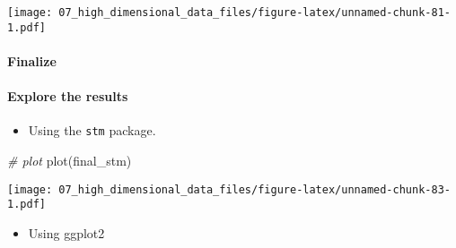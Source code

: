 \documentclass[
]{book}
\newenvironment{Shaded}{\begin{snugshade}}{\end{snugshade}}
\newcommand{\AttributeTok}[1]{\textcolor[rgb]{0.77,0.63,0.00}{#1}}
\newcommand{\CommentTok}[1]{\textcolor[rgb]{0.56,0.35,0.01}{\textit{#1}}}
\newcommand{\ConstantTok}[1]{\textcolor[rgb]{0.00,0.00,0.00}{#1}}
\newcommand{\DecValTok}[1]{\textcolor[rgb]{0.00,0.00,0.81}{#1}}
\newcommand{\FunctionTok}[1]{\textcolor[rgb]{0.00,0.00,0.00}{#1}}
\newcommand{\NormalTok}[1]{#1}
\newcommand{\OtherTok}[1]{\textcolor[rgb]{0.56,0.35,0.01}{#1}}
\newcommand{\SpecialCharTok}[1]{\textcolor[rgb]{0.00,0.00,0.00}{#1}}
\newcommand{\StringTok}[1]{\textcolor[rgb]{0.31,0.60,0.02}{#1}}
\providecommand{\tightlist}{%
  \setlength{\itemsep}{0pt}\setlength{\parskip}{0pt}}
\begin{document}
\texttt{[image: 07\_high\_dimensional\_data\_files/figure-latex/unnamed-chunk-81-1.pdf]}

\hypertarget{finalize}{%
\paragraph{Finalize}\label{finalize}}

\begin{Shaded}
\end{Shaded}

\hypertarget{explore-the-results}{%
\paragraph{Explore the results}\label{explore-the-results}}

\begin{itemize}
\tightlist
\item
  Using the \texttt{stm} package.
\end{itemize}

\begin{Shaded}
\begin{Highlighting}[]
\CommentTok{\# plot}
\FunctionTok{plot}\NormalTok{(final\_stm)}
\end{Highlighting}
\end{Shaded}

\texttt{[image: 07\_high\_dimensional\_data\_files/figure-latex/unnamed-chunk-83-1.pdf]}

\begin{itemize}
\tightlist
\item
  Using ggplot2
\end{itemize}
\end{document}
